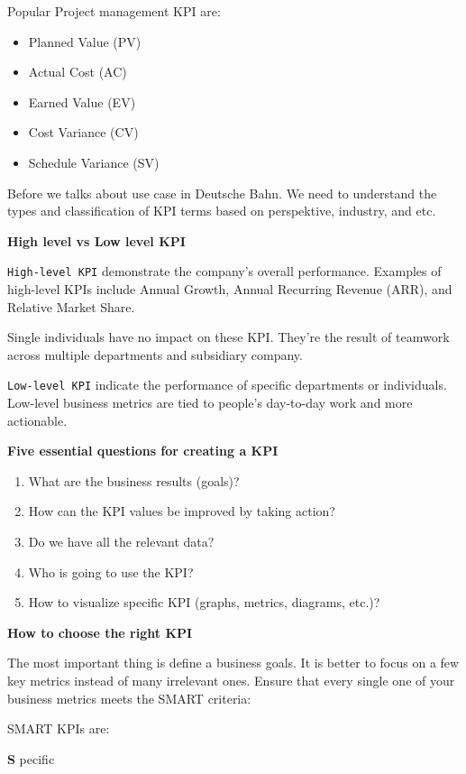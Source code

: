 \documentclass[]{book}
\providecommand{\tightlist}{%
  \setlength{\itemsep}{0pt}\setlength{\parskip}{0pt}}
\begin{document}
Popular Project management KPI are:

\begin{itemize}
\tightlist
\item
  Planned Value (PV)
\item
  Actual Cost (AC)
\item
  Earned Value (EV)
\item
  Cost Variance (CV)
\item
  Schedule Variance (SV)
\end{itemize}

Before we talks about use case in Deutsche Bahn. We need to understand
the types and classification of KPI terms based on perspektive,
industry, and etc.

\textbf{High level vs Low level KPI }

\texttt{High-level\ KPI} demonstrate the company's overall performance.
Examples of high-level KPIs include Annual Growth, Annual Recurring
Revenue (ARR), and Relative Market Share.

Single individuals have no impact on these KPI. They're the result of
teamwork across multiple departments and subsidiary company.

\texttt{Low-level\ KPI} indicate the performance of specific departments
or individuals. Low-level business metrics are tied to people's
day-to-day work and more actionable.

\textbf{Five essential questions for creating a KPI }

\begin{enumerate}
\def\labelenumi{\arabic{enumi}.}
\tightlist
\item
  What are the business results (goals)?
\item
  How can the KPI values be improved by taking action?
\item
  Do we have all the relevant data?
\item
  Who is going to use the KPI?
\item
  How to visualize specific KPI (graphs, metrics, diagrams, etc.)?
\end{enumerate}

\textbf{How to choose the right KPI}

The most important thing is define a business goals. It is better to
focus on a few key metrics instead of many irrelevant ones. Ensure that
every single one of your business metrics meets the SMART criteria:

SMART KPIs are:

\textbf{S }pecific
\end{document}
